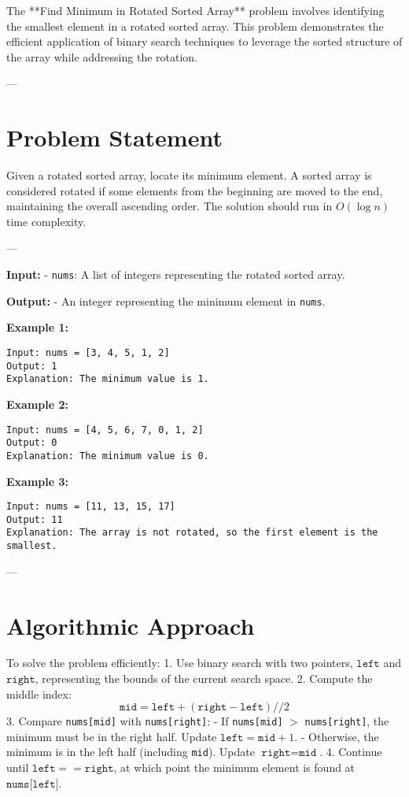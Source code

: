 
\label{problem:Find_Minimum_in_Rotated_Sorted_Array}

The **Find Minimum in Rotated Sorted Array** problem involves identifying the smallest element in a rotated sorted array. This problem demonstrates the efficient application of binary search techniques to leverage the sorted structure of the array while addressing the rotation.

---

\section*{Problem Statement}
Given a rotated sorted array, locate its minimum element. A sorted array is considered rotated if some elements from the beginning are moved to the end, maintaining the overall ascending order. The solution should run in \(O(\log n)\) time complexity.

---

\textbf{Input:}
- \texttt{nums}: A list of integers representing the rotated sorted array.

\textbf{Output:}
- An integer representing the minimum element in \texttt{nums}.

\textbf{Example 1:}
\begin{verbatim}
Input: nums = [3, 4, 5, 1, 2]
Output: 1
Explanation: The minimum value is 1.
\end{verbatim}

\textbf{Example 2:}
\begin{verbatim}
Input: nums = [4, 5, 6, 7, 0, 1, 2]
Output: 0
Explanation: The minimum value is 0.
\end{verbatim}

\textbf{Example 3:}
\begin{verbatim}
Input: nums = [11, 13, 15, 17]
Output: 11
Explanation: The array is not rotated, so the first element is the smallest.
\end{verbatim}

---

\section*{Algorithmic Approach}

To solve the problem efficiently:
1. Use binary search with two pointers, \( \texttt{left} \) and \( \texttt{right} \), representing the bounds of the current search space.
2. Compute the middle index:
   \[
   \texttt{mid} = \texttt{left} + (\texttt{right} - \texttt{left}) // 2
   \]
3. Compare \texttt{nums[mid]} with \texttt{nums[right]}:
   - If \texttt{nums[mid]} \(>\) \texttt{nums[right]}, the minimum must be in the right half. Update \( \texttt{left} = \texttt{mid} + 1 \).
   - Otherwise, the minimum is in the left half (including \texttt{mid}). Update \( \texttt{right} = \texttt{mid} \).
4. Continue until \( \texttt{left} == \texttt{right} \), at which point the minimum element is found at \( \texttt{nums[left]} \).


